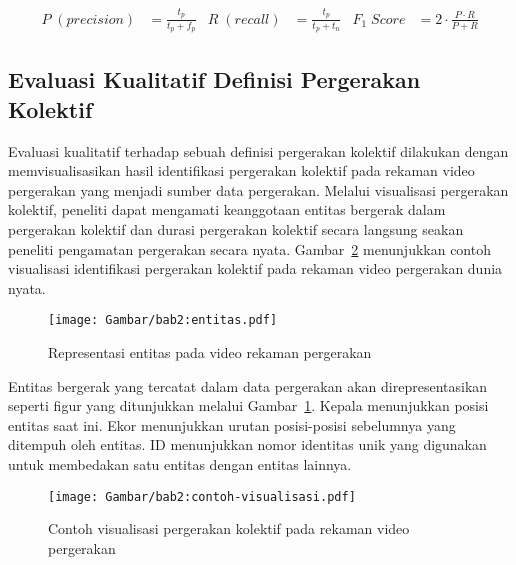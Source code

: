 \begin{equation}
    \begin{aligned}
        P\;(precision) & = \frac{t_p}{t_p + f_p} & R\;(recall) & = \frac{t_p}{t_p + t_n} & F_1\;Score & = 2 \cdot \frac{P \cdot R}{P + R}
    \end{aligned}
    \label{bab2:rumus-confusion}
\end{equation}

\subsection{Evaluasi Kualitatif Definisi Pergerakan Kolektif}
\label{subsec:qualitative-theory}

Evaluasi kualitatif terhadap sebuah definisi pergerakan kolektif dilakukan dengan memvisualisasikan hasil identifikasi pergerakan kolektif pada rekaman video pergerakan yang menjadi sumber data pergerakan. Melalui visualisasi pergerakan kolektif, peneliti dapat mengamati keanggotaan entitas bergerak dalam pergerakan kolektif dan durasi pergerakan kolektif secara langsung seakan peneliti pengamatan pergerakan secara nyata. Gambar~\ref{bab2:visualization} menunjukkan contoh visualisasi identifikasi pergerakan kolektif pada rekaman video pergerakan dunia nyata.

\begin{figure}[b!]
    \centering
    \texttt{[image: Gambar/bab2:entitas.pdf]}
    \caption{Representasi entitas pada video rekaman pergerakan}
    \label{bab2:entitas}
\end{figure}

Entitas bergerak yang tercatat dalam data pergerakan akan direpresentasikan seperti figur yang ditunjukkan melalui Gambar~\ref{bab2:entitas}. Kepala menunjukkan posisi entitas saat ini. Ekor menunjukkan urutan posisi-posisi sebelumnya yang ditempuh oleh entitas. ID menunjukkan nomor identitas unik yang digunakan untuk membedakan satu entitas dengan entitas lainnya.

\begin{figure}[t]
    \centering
    \texttt{[image: Gambar/bab2:contoh-visualisasi.pdf]}
    \caption[Contoh visualisasi pergerakan kolektif]{Contoh visualisasi pergerakan kolektif pada rekaman video pergerakan}
    \label{bab2:visualization}
\end{figure}

